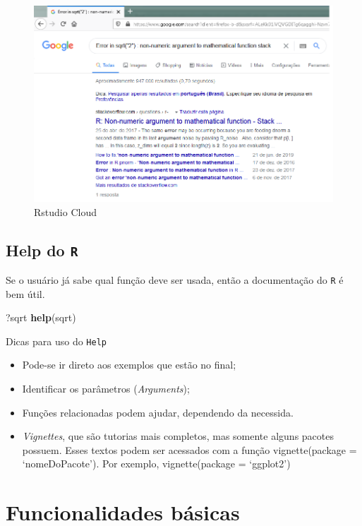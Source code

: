 \documentclass[
]{book}
\newenvironment{Shaded}{\begin{snugshade}}{\end{snugshade}}
\newcommand{\KeywordTok}[1]{\textcolor[rgb]{0.13,0.29,0.53}{\textbf{#1}}}
\newcommand{\NormalTok}[1]{#1}
\providecommand{\tightlist}{%
  \setlength{\itemsep}{0pt}\setlength{\parskip}{0pt}}
\theoremstyle{definition}
\theoremstyle{definition}
\theoremstyle{definition}
\theoremstyle{remark}
\begin{document}
\begin{figure}
\includegraphics[width=0.9\linewidth]{Figuras/sqrt2} \caption{Rstudio Cloud}\label{fig:sq2}
\end{figure}

\hypertarget{help-do-r}{%
\subsection{\texorpdfstring{Help do \texttt{R}}{Help do R}}\label{help-do-r}}

Se o usuário já sabe qual função deve ser usada, então a documentação do \texttt{R} é bem útil.

\begin{Shaded}
\begin{Highlighting}[]
\NormalTok{?sqrt}
\KeywordTok{help}\NormalTok{(sqrt)}
\end{Highlighting}
\end{Shaded}

Dicas para uso do \texttt{Help}

\begin{itemize}
\tightlist
\item
  Pode-se ir direto aos exemplos que estão no final;
\item
  Identificar os parâmetros (\emph{Arguments});
\item
  Funções relacionadas podem ajudar, dependendo da necessida.
\item
  \emph{Vignettes}, que são tutorias mais completos, mas somente alguns pacotes possuem. Esses textos podem ser acessados com a função vignette(package = `nomeDoPacote'). Por exemplo, vignette(package = `ggplot2')
\end{itemize}

\hypertarget{funcionalidades-buxe1sicas}{%
\section{Funcionalidades básicas}\label{funcionalidades-buxe1sicas}}
\end{document}
